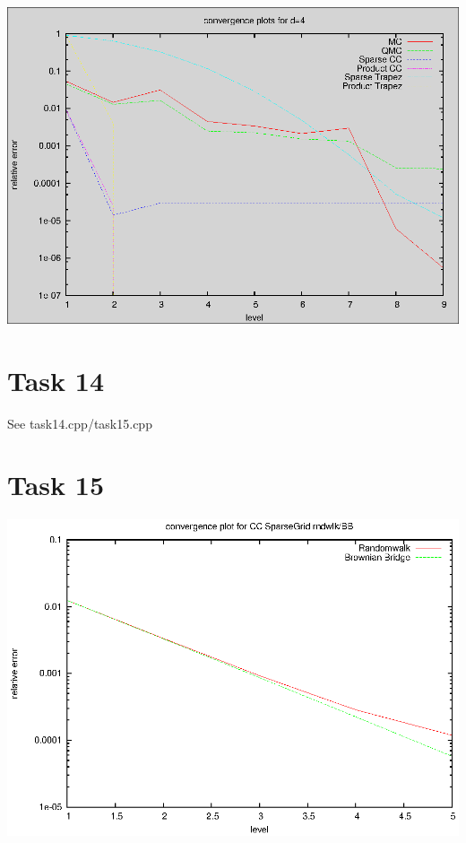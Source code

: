 \documentclass[]{article}
\begin{document}
\includegraphics[width=.9\textwidth]{task13_d8}\\

\section*{Task 14}
See task14.cpp/task15.cpp

\section*{Task 15}
\includegraphics{task15}\\
\end{document}
